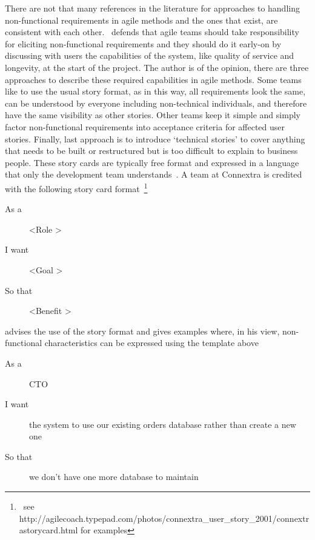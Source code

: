 \documentclass[dissertation,final]{softeng}
\newcommand{\nfrs}{non-functional requirements\xspace}
\begin{document}
There are not that many references in the literature for approaches to handling non-functional requirements in agile methods and the ones that exist, are consistent with each other.~\citet{Davies} defends that agile teams should take responsibility for eliciting non-functional requirements and they should do it early-on by discussing with users the capabilities of the system, like quality of service and longevity, at the start of the project. The author is of the opinion, there are three approaches to describe these required capabilities in agile methods. Some teams like to use the usual story format, as in this way, all requirements look the same, can be understood by everyone including non-technical individuals, and therefore have the same visibility as other stories. Other teams keep it simple and simply factor \nfrs into acceptance criteria for affected user stories. Finally, last approach is to introduce `technical stories' to cover anything that needs to be built or restructured but is too difficult to explain to business people. These story cards are typically free format and expressed in a language that only the development team understands~\citep{Davies}. A team at Connextra is credited with the following story card format~\footnote{~see http://agilecoach.typepad.com/photos/connextra\_user\_story\_2001/connextrastorycard.html for examples}

\begin{center}
\begin{description}
\item[As a] \textless Role \textgreater
\item[I want] \textless Goal \textgreater
\item[So that] \textless Benefit \textgreater
\end{description}
\end{center}

\citet{CohnNFRS} advises the use of the story format and gives examples where, in his view, non-functional characteristics can be expressed using the template above

\begin{center}
\begin{description}
\item[As a] CTO 
\item[I want] the system to use our existing orders database rather than create a new one
\item[So that] we don't have one more database to maintain
\end{description}
\end{center}
\end{document}
